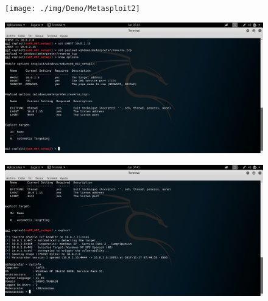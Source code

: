 \documentclass{beamer}
\begin{document}
\begin{frame}
	\begin{figure}[h]
\centering
		\texttt{[image: ./img/Demo/Metasploit2]}
\end{figure}
\end{frame}

\begin{frame}
	\begin{figure}[h]
\centering
		\includegraphics[scale=0.3]{./img/Demo/Metasploit3}
\end{figure}
\end{frame}

\begin{frame}
	\begin{figure}[h]
\centering
		\includegraphics[scale=0.3]{./img/Demo/Metasploit4}
\end{figure}
\end{frame}
\end{document}
